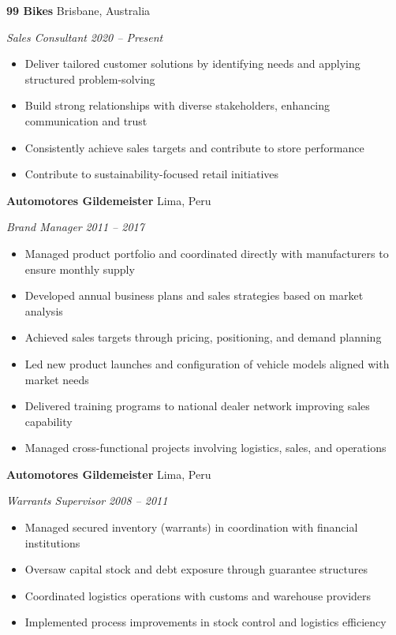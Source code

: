 \documentclass[11pt,letterpaper]{article}
\newcommand{\entry}[4]{%
  \noindent\textbf{#1} \hfill #2 \par\nopagebreak
  \textit{#3} \hfill \textit{#4} \par\nopagebreak
}
\begin{document}
\entry{99 Bikes}{Brisbane, Australia}{Sales Consultant}{2020 -- Present}
\begin{itemize}
  \item Deliver tailored customer solutions by identifying needs and applying structured problem-solving
  \item Build strong relationships with diverse stakeholders, enhancing communication and trust
  \item Consistently achieve sales targets and contribute to store performance
  \item Contribute to sustainability-focused retail initiatives
\end{itemize}
\vspace{0.3em}

\entry{Automotores Gildemeister}{Lima, Peru}{Brand Manager}{2011 -- 2017}
\begin{itemize}
  \item Managed product portfolio and coordinated directly with manufacturers to ensure monthly supply
  \item Developed annual business plans and sales strategies based on market analysis
  \item Achieved sales targets through pricing, positioning, and demand planning
  \item Led new product launches and configuration of vehicle models aligned with market needs
  \item Delivered training programs to national dealer network improving sales capability
  \item Managed cross-functional projects involving logistics, sales, and operations
\end{itemize}
\vspace{0.3em}

\entry{Automotores Gildemeister}{Lima, Peru}{Warrants Supervisor}{2008 -- 2011}
\begin{itemize}
  \item Managed secured inventory (warrants) in coordination with financial institutions
  \item Oversaw capital stock and debt exposure through guarantee structures
  \item Coordinated logistics operations with customs and warehouse providers
  \item Implemented process improvements in stock control and logistics efficiency
\end{itemize}
\vspace{0.3em}
\end{document}
